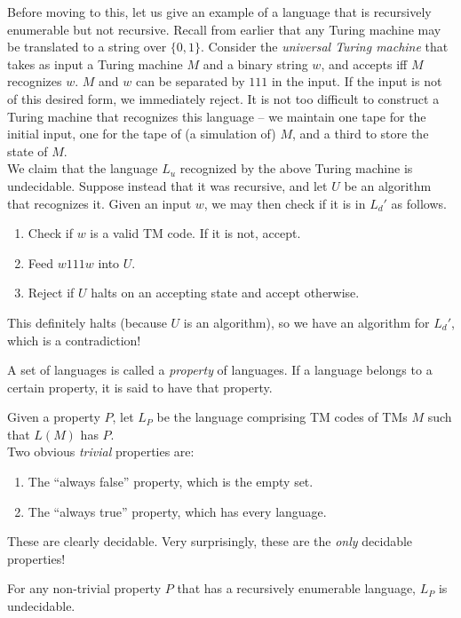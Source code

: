 	Before moving to this, let us give an example of a language that is recursively enumerable but not recursive. Recall from earlier that any Turing machine may be translated to a string over $\{0,1\}$. Consider the \emph{universal Turing machine} that takes as input a Turing machine $M$ and a binary string $w$, and accepts iff $M$ recognizes $w$. $M$ and $w$ can be separated by $111$ in the input. If the input is not of this desired form, we immediately reject. It is not too difficult to construct a Turing machine that recognizes this language -- we maintain one tape for the initial input, one for the tape of (a simulation of) $M$, and a third to store the state of $M$.\\
	We claim that the language $L_u$ recognized by the above Turing machine is undecidable. Suppose instead that it was recursive, and let $U$ be an algorithm that recognizes it. Given an input $w$, we may then check if it is in $L_d'$ as follows.
	\begin{enumerate}
		\item Check if $w$ is a valid TM code. If it is not, accept.
		\item Feed $w111w$ into $U$.
		\item Reject if $U$ halts on an accepting state and accept otherwise.
	\end{enumerate}
	This definitely halts (because $U$ is an algorithm), so we have an algorithm for $L_d'$, which is a contradiction!

	\begin{definition}[Property]
		A set of languages is called a \emph{property} of languages. If a language belongs to a certain property, it is said to have that property.
	\end{definition}
	Given a property $P$, let $L_P$ be the language comprising TM codes of TMs $M$ such that $L(M)$ has $P$.\\
	Two obvious \emph{trivial} properties are:
	\begin{enumerate}
		\item The ``always false'' property, which is the empty set.
		\item The ``always true'' property, which has every language.
	\end{enumerate}
	These are clearly decidable. Very surprisingly, these are the \emph{only} decidable properties!

	\begin{ftheo}
		For any non-trivial property $P$ that has a recursively enumerable language, $L_P$ is undecidable.
	\end{ftheo}


